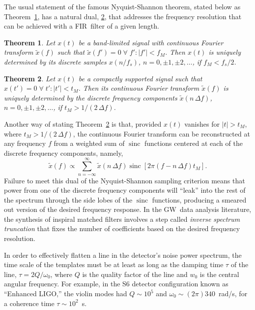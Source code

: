 \documentclass[preprint2]{aastex}
\newtheorem{thm}{Theorem}
\newcommand{\GW}{GW}%
\newcommand{\fir}{FIR}%
\DeclareMathOperator{\sinc}{sinc}
\begin{document}
The usual statement of the famous Nyquist-Shannon theorem, stated below as Theorem~\ref{thm:nyquist}, has a natural dual, \ref{thm:nyquist-dual}, that addresses the frequency resolution that can be achieved with a \fir\ filter of a given length.

\begin{thm}
	\label{thm:nyquist}
	\citep[after][p. 518]{oppenheim1997signals}
	Let $x(t)$ be a band-limited signal with continuous Fourier transform $\tilde{x}(f)$ such that $\tilde{x}(f') = 0 \; \forall \; f' : |f'| < f_M$.  Then $x(t)$ is uniquely determined by its discrete samples $x(n/f_s)$, $n = 0, \pm 1, \pm 2, \dots$, if $f_M < f_s / 2$.
\end{thm}

\begin{thm}
	\label{thm:nyquist-dual}
	Let $x(t)$ be a compactly supported signal such that $x(t') = 0 \; \forall \; t' : |t'| < t_M$.  Then its continuous Fourier transform $\tilde{x}(f)$ is uniquely determined by the discrete frequency components $\tilde{x}(n \, \Delta f)$, $n = 0, \pm 1, \pm 2, \dots$, if $t_M > 1 / (2 \, \Delta f)$.
\end{thm}

Another way of stating Theorem~\ref{thm:nyquist-dual} is that, provided $x(t)$ vanishes for $|t| > t_M$, where $t_M > 1 / (2 \, \Delta f)$, the continuous Fourier transform can be reconstructed at any frequency $f$ from a weighted sum of $\sinc$ functions centered at each of the discrete frequency components, namely,
$$
	\tilde{x}(f) \propto \sum_{n=-\infty}^{\infty} \tilde{x}\left(n \, \Delta f\right) \sinc \left[ 2 \pi (f - n \, \Delta f) t_M \right].
$$
Failure to meet this dual of the Nyquist-Shannon sampling criterion means that power from one of the discrete frequency components will ``leak'' into the rest of the spectrum through the side lobes of the $\sinc$ functions, producing a smeared out version of the desired frequency response.  In the \GW\ data analysis literature, the synthesis of inspiral matched filters involves a step called \emph{inverse spectrum truncation} \citep[see][section VII]{findchirppaper} that fixes the number of coefficients based on the desired frequency resolution.

In order to effectively flatten a line in the detector's noise power
spectrum, the time scale of the templates must be at least as long as
the damping time $\tau$ of the line, $\tau = 2 Q / \omega_0$, where $Q$ is the quality
factor of the line and $w_0$ is the central angular frequency.  For example,
in the S6 detector configuration known as ``Enhanced LIGO,'' the violin modes \citep{ELIGOSusp} had $Q \sim 10^5$ and $\omega_0 \sim (2 \pi) 340$~rad/s, for a coherence time $\tau \sim 10^2$~s.
\end{document}
